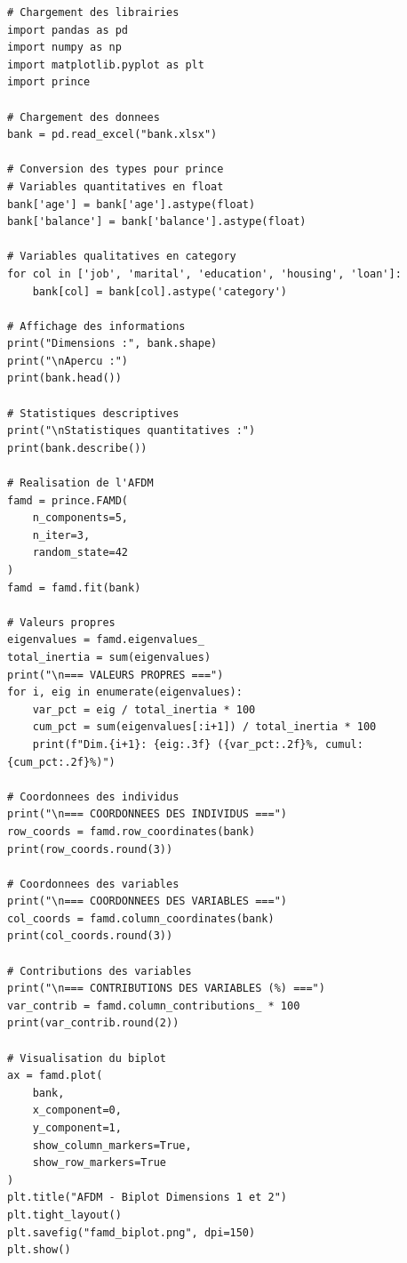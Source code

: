 \documentclass[12pt,a4paper]{article}
\begin{document}
\begin{lstlisting}[style=Pythonstyle, caption={Code Python pour l'AFDM avec prince}]
# Chargement des librairies
import pandas as pd
import numpy as np
import matplotlib.pyplot as plt
import prince

# Chargement des donnees
bank = pd.read_excel("bank.xlsx")

# Conversion des types pour prince
# Variables quantitatives en float
bank['age'] = bank['age'].astype(float)
bank['balance'] = bank['balance'].astype(float)

# Variables qualitatives en category
for col in ['job', 'marital', 'education', 'housing', 'loan']:
    bank[col] = bank[col].astype('category')

# Affichage des informations
print("Dimensions :", bank.shape)
print("\nApercu :")
print(bank.head())

# Statistiques descriptives
print("\nStatistiques quantitatives :")
print(bank.describe())

# Realisation de l'AFDM
famd = prince.FAMD(
    n_components=5,
    n_iter=3,
    random_state=42
)
famd = famd.fit(bank)

# Valeurs propres
eigenvalues = famd.eigenvalues_
total_inertia = sum(eigenvalues)
print("\n=== VALEURS PROPRES ===")
for i, eig in enumerate(eigenvalues):
    var_pct = eig / total_inertia * 100
    cum_pct = sum(eigenvalues[:i+1]) / total_inertia * 100
    print(f"Dim.{i+1}: {eig:.3f} ({var_pct:.2f}%, cumul: {cum_pct:.2f}%)")

# Coordonnees des individus
print("\n=== COORDONNEES DES INDIVIDUS ===")
row_coords = famd.row_coordinates(bank)
print(row_coords.round(3))

# Coordonnees des variables
print("\n=== COORDONNEES DES VARIABLES ===")
col_coords = famd.column_coordinates(bank)
print(col_coords.round(3))

# Contributions des variables
print("\n=== CONTRIBUTIONS DES VARIABLES (%) ===")
var_contrib = famd.column_contributions_ * 100
print(var_contrib.round(2))

# Visualisation du biplot
ax = famd.plot(
    bank,
    x_component=0,
    y_component=1,
    show_column_markers=True,
    show_row_markers=True
)
plt.title("AFDM - Biplot Dimensions 1 et 2")
plt.tight_layout()
plt.savefig("famd_biplot.png", dpi=150)
plt.show()
\end{lstlisting}

\end{document}
